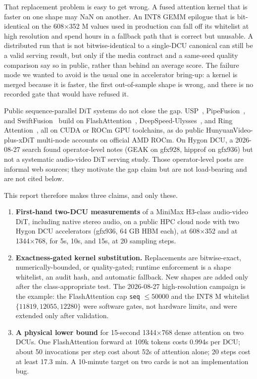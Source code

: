 \documentclass[11pt]{article}
\begin{document}
That replacement problem is easy to get wrong. A fused attention kernel that is faster on one shape may NaN on another. An INT8 GEMM epilogue that is bit-identical on the 608$\times$352 M values used in production can fall off its whitelist at high resolution and spend hours in a fallback path that is correct but unusable. A distributed run that is not bitwise-identical to a single-DCU canonical can still be a valid serving result, but only if the media contract and a same-seed quality comparison say so in public, rather than behind an average score. The failure mode we wanted to avoid is the usual one in accelerator bring-up: a kernel is merged because it is faster, the first out-of-sample shape is wrong, and there is no recorded gate that would have refused it.

Public sequence-parallel DiT systems do not close the gap. USP~\cite{1}, PipeFusion~\cite{2}, and SwiftFusion~\cite{3} build on FlashAttention~\cite{4,5}, DeepSpeed-Ulysses~\cite{6}, and Ring Attention~\cite{7}, all on CUDA or ROCm GPU toolchains, as do public HunyuanVideo-plus-xDiT multi-node accounts on official AMD ROCm. On Hygon DCU, a 2026-08-27 search found operator-level notes (GEAK on gfx928, hipprof on gfx936) but not a systematic audio-video DiT serving study. Those operator-level posts are informal web sources; they motivate the gap claim but are not load-bearing and are not cited below.

This report therefore makes three claims, and only these.

\begin{enumerate}
\item \textbf{First-hand two-DCU measurements} of a MiniMax H3-class audio-video DiT, including native stereo audio, on a public HPC cloud node with two Hygon DCU accelerators (gfx936, 64 GB HBM each), at 608$\times$352 and at 1344$\times$768, for 5s, 10s, and 15s, at 20 sampling steps.

\item \textbf{Exactness-gated kernel substitution.} Replacements are bitwise-exact, numerically-bounded, or quality-gated; runtime enforcement is a shape whitelist, an audit hash, and automatic fallback. New shapes are added only after the class-appropriate test. The 2026-08-27 high-resolution campaign is the example: the FlashAttention cap \texttt{seq} $\leq 50000$ and the INT8 M whitelist $\{11819, 12055, 12280\}$ were software gates, not hardware limits, and were extended only after validation.

\item \textbf{A physical lower bound} for 15-second 1344$\times$768 dense attention on two DCUs. One FlashAttention forward at 109k tokens costs 0.994s per DCU; about 50 invocations per step cost about 52s of attention alone; 20 steps cost at least 17.3 min. A 10-minute target on two cards is not an implementation bug.
\end{enumerate}
\end{document}
